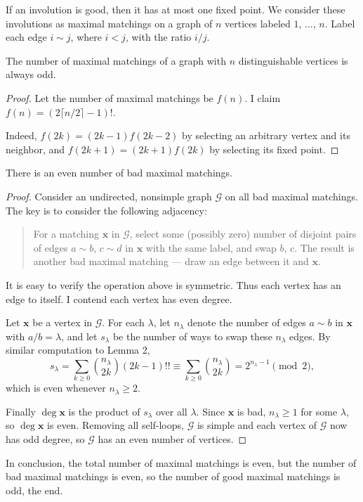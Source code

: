If an involution is good, then it has at most one fixed point. We consider these involutions as maximal matchings on a graph of $n$ vertices labeled $1$, $\ldots$, $n$. Label each edge $i\sim j$, where $i<j$, with the ratio $i/j$.
\begin{lemma}
    The number of maximal matchings of a graph with $n$ distinguishable vertices is always odd.
\end{lemma}
\begin{proof}
    Let the number of maximal matchings be $f(n)$. I claim $f(n)=(2\lceil n/2\rceil-1)!$.

    Indeed, $f(2k)=(2k-1)f(2k-2)$ by selecting an arbitrary vertex and its neighbor, and $f(2k+1)=(2k+1)f(2k)$ by selecting its fixed point.
\end{proof}
\begin{lemma}
    There is an even number of bad maximal matchings.
\end{lemma}
\begin{proof}
    Consider an undirected, nonsimple graph $\mathcal G$ on all bad maximal matchings. The key is to consider the following adjacency:
    \begin{quote}
        For a matching $\mathbf x$ in $\mathcal G$, select some (possibly zero) number of disjoint pairs of edges $a\sim b$, $c\sim d$ in $\mathbf x$ with the same label, and swap $b$, $c$. The result is another bad maximal matching --- draw an edge between it and $\mathbf x$.
    \end{quote}
    It is easy to verify the operation above is symmetric. Thus each vertex has an edge to itself. I contend each vertex has even degree.

    Let $\mathbf x$ be a vertex in $\mathcal G$. For each $\lambda$, let $n_\lambda$ denote the number of edges $a\sim b$ in $\mathbf x$ with $a/b=\lambda$, and let $s_\lambda$ be the number of ways to swap these $n_\lambda$ edges. By similar computation to Lemma 2, \[s_\lambda=\sum_{k\ge0}\binom{n_\lambda}{2k}(2k-1)!!\equiv\sum_{k\ge0}\binom{n_\lambda}{2k}=2^{n_\lambda-1}\pmod2,\]
    which is even whenever $n_\lambda\ge2$.

    Finally $\deg\mathbf x$ is the product of $s_\lambda$ over all $\lambda$. Since $\mathbf x$ is bad, $n_\lambda\ge1$ for some $\lambda$, so $\deg\mathbf x$ is even. Removing all self-loops, $\mathcal G$ is simple and each vertex of $\mathcal G$ now has odd degree, so $\mathcal G$ has an even number of vertices.
\end{proof}

In conclusion, the total number of maximal matchings is even, but the number of bad maximal matchings is even, so the number of good maximal matchings is odd, the end.


